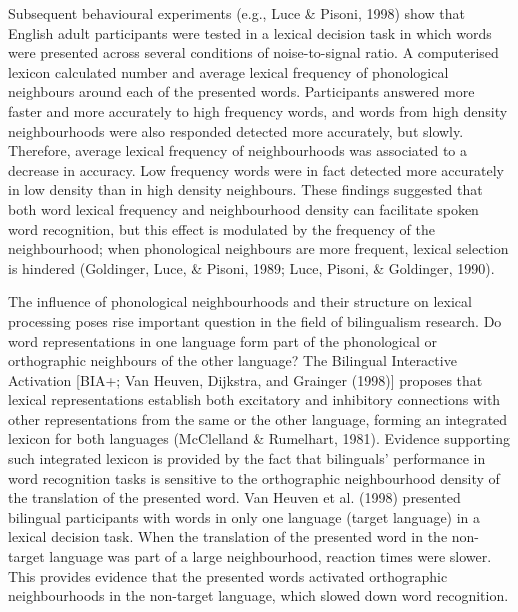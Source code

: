 \documentclass[
  english,
  man,floatsintext]{apa6}
\begin{document}
Subsequent behavioural experiments (e.g., Luce \& Pisoni, 1998) show that English adult participants were tested in a lexical decision task in which words were presented across several conditions of noise-to-signal ratio. A computerised lexicon calculated number and average lexical frequency of phonological neighbours around each of the presented words. Participants answered more faster and more accurately to high frequency words, and words from high density neighbourhoods were also responded detected more accurately, but slowly. Therefore, average lexical frequency of neighbourhoods was associated to a decrease in accuracy. Low frequency words were in fact detected more accurately in low density than in high density neighbours. These findings suggested that both word lexical frequency and neighbourhood density can facilitate spoken word recognition, but this effect is modulated by the frequency of the neighbourhood; when phonological neighbours are more frequent, lexical selection is hindered (Goldinger, Luce, \& Pisoni, 1989; Luce, Pisoni, \& Goldinger, 1990).

The influence of phonological neighbourhoods and their structure on lexical processing poses rise important question in the field of bilingualism research. Do word representations in one language form part of the phonological or orthographic neighbours of the other language? The Bilingual Interactive Activation {[}BIA+; Van Heuven, Dijkstra, and Grainger (1998){]} proposes that lexical representations establish both excitatory and inhibitory connections with other representations from the same or the other language, forming an integrated lexicon for both languages (McClelland \& Rumelhart, 1981). Evidence supporting such integrated lexicon is provided by the fact that bilinguals' performance in word recognition tasks is sensitive to the orthographic neighbourhood density of the translation of the presented word. Van Heuven et al. (1998) presented bilingual participants with words in only one language (target language) in a lexical decision task. When the translation of the presented word in the non-target language was part of a large neighbourhood, reaction times were slower. This provides evidence that the presented words activated orthographic neighbourhoods in the non-target language, which slowed down word recognition.
\end{document}
